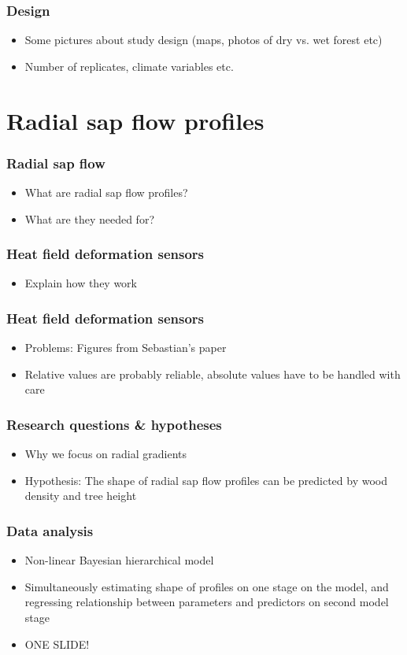 \documentclass[usepdftitle=false]{beamer}
\begin{document}
\begin{frame}
	\frametitle{Design}
	\begin{itemize}
		\item Some pictures about study design (maps, photos of dry vs. wet forest etc)
		\item Number of replicates, climate variables etc.
	\end{itemize}
\end{frame}


\section{Radial sap flow profiles}
\begin{frame}
	\frametitle{Radial sap flow}
	\begin{itemize}
		\item What are radial sap flow profiles?
		\item What are they needed for?
	\end{itemize}
\end{frame}

\begin{frame}
	\frametitle{Heat field deformation sensors}
	\begin{itemize}
		\item Explain how they work
	\end{itemize}
\end{frame}

\begin{frame}
	\frametitle{Heat field deformation sensors}
	\begin{itemize}
		\item Problems: Figures from Sebastian's paper
		\item Relative values are probably reliable, absolute values have to be handled with care
	\end{itemize}
\end{frame}

\begin{frame}
	\frametitle{Research questions \& hypotheses}
	\begin{itemize}
		\item Why we focus on radial gradients
		\item Hypothesis: The shape of radial sap flow profiles can be predicted by wood density and tree height 
	\end{itemize}
\end{frame}

\begin{frame}
	\frametitle{Data analysis}
	\begin{itemize}
		\item Non-linear Bayesian hierarchical model
		\item Simultaneously estimating shape of profiles on one stage on the model, and regressing relationship between parameters and predictors on second model stage
		\item ONE SLIDE!
	\end{itemize}
\end{frame}
\end{document}
